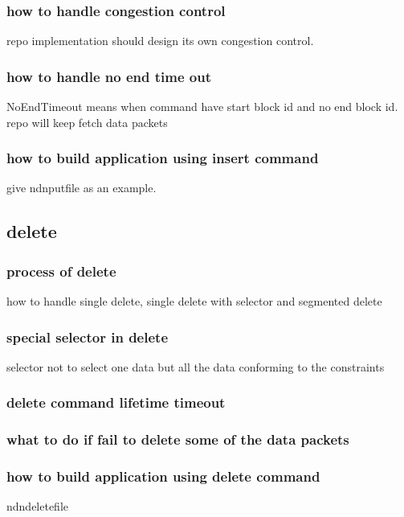 \documentclass[conference]{IEEEtran}
\begin{document}
\subsubsection{how to handle congestion control}
repo implementation should design its own congestion control.

\subsubsection{how to handle no end time out}
NoEndTimeout means when command have start block id and no end block id. repo will keep fetch data packets

\subsubsection{how to build application using insert command}
give ndnputfile as an example.

\subsection{delete}

\subsubsection{process of delete}
how to handle single delete, single delete with selector and segmented delete

\subsubsection{special selector in delete}
selector not to select one data but all the data conforming to the constraints

\subsubsection{delete command lifetime timeout}

\subsubsection{what to do if fail to delete some of the data packets}

\subsubsection{how to build application using delete command}
ndndeletefile
\end{document}
